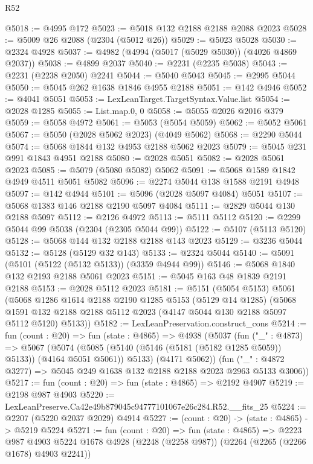 \begin{lexlean}{R52}
\begin{coremodule}
@5018 := @4995 @172
@5023 := @5018 @132 @2188 @2188 @2088 @2023
@5028 := @5009 @26 @2088 (@2304 (@5012 @26))
@5029 := @5023 @5028
@5030 := @2324 @4928
@5037 := @4982 (@4994 (@5017 (@5029 @5030)) (@4026 @4869 @2037))
@5038 := @4899 @2037
@5040 := @2231 (@2235 @5038)
@5043 := @2231 (@2238 @2050) @2241
@5044 := @5040 @5043
@5045 := @2995 @5044
@5050 := @5045 @262 @1638 @1846 @4955 @2188
@5051 := @142 @4946
@5052 := @4041 @5051
@5053 := LexLeanTarget.TargetSyntax.Value.list
@5054 := @2028 @1285
@5055 := List.map.{0, 0}
@5058 := @5055 @2026 @2016 @379
@5059 := @5058 @4972
@5061 := @5053 (@5054 @5059)
@5062 := @5052 @5061
@5067 := @5050 (@2028 @5062 @2023) (@4049 @5062)
@5068 := @2290 @5044
@5074 := @5068 @1844 @132 @4953 @2188 @5062 @2023
@5079 := @5045 @231 @991 @1843 @4951 @2188
@5080 := @2028 @5051
@5082 := @2028 @5061 @2023
@5085 := @5079 (@5080 @5082) @5062
@5091 := @5068 @1589 @1842 @4949 @4511 @5051 @5082
@5096 := @2274 @5044 @138 @1588 @2191 @4948
@5097 := @142 @4944
@5101 := @5096 (@2028 @5097 @4084) @5051
@5107 := @5068 @1383 @146 @2188 @2190 @5097 @4084
@5111 := @2829 @5044 @130 @2188 @5097
@5112 := @2126 @4972
@5113 := @5111 @5112
@5120 := @2299 @5044 @99 @5038 (@2304 (@2305 @5044 @99))
@5122 := @5107 (@5113 @5120)
@5128 := @5068 @144 @132 @2188 @2188 @143 @2023
@5129 := @3236 @5044
@5132 := @5128 (@5129 @32 @143)
@5133 := @2324 @5044
@5140 := @5091 (@5101 (@5122 (@5132 @5133)) (@3359 @4944 @99))
@5146 := @5068 @1840 @132 @2193 @2188 @5061 @2023
@5151 := @5045 @163 @48 @1839 @2191 @2188
@5153 := @2028 @5112 @2023
@5181 := @5151
    (@5054 @5153)
    @5061
    (@5068
      @1286
      @1614
      @2188
      @2190
      @1285
      @5153
      (@5129 @14 @1285)
      (@5068 @1591 @132 @2188 @2188 @5112 @2023 (@4147 @5044 @130 @2188 @5097 @5112 @5120) @5133))
@5182 := LexLeanPreservation.construct_cons
@5214 := fun (count : @20) =>
  fun (state : @4865) =>
  @4938
    (@5037
      (fun ("_" : @4873) =>
      @5067
        (@5074 (@5085 (@5140 (@5146 (@5181 (@5182 @1285 @5059)) @5133)) (@4164 @5051 @5061)) @5133)
        (@4171 @5062))
      (fun ("_" : @4872 @3277) => @5045 @249 @1638 @132 @2188 @2188 @2023 @2963 @5133 @3006))
@5217 := fun (count : @20) => fun (state : @4865) => @2192 @4907
@5219 := @2198 @987 @4903
@5220 := LexLeanPreserve.Ca42e49b879045c94777101067e26c284.R52.__fits_25
@5224 := @2207 (@5220 @2037 @2029) @4914
@5227 := (count : @20) -> (state : @4865) -> @5219 @5224
@5271 := fun (count : @20) =>
  fun (state : @4865) =>
  @2223
    @987
    @4903
    @5224
    @1678
    @4928
    (@2248 (@2258 @987))
    (@2264 (@2265 (@2266 @1678) @4903 @2241))

\end{coremodule}
\end{lexlean}
